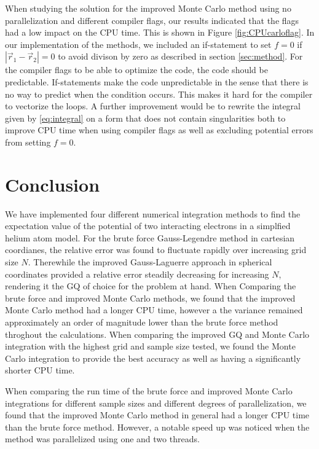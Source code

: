\documentclass[10pt, twocolumn]{aastex62}
\begin{document}
When studying the solution for the improved Monte Carlo method using no
parallelization and different compiler flags, our results indicated that the
flags had a low impact on the CPU time. This is shown in Figure
\ref{fig:CPUcarloflag}. In our implementation of the methods, we included an
if-statement to set $f=0$ if $|\vec{r}_1 - \vec{r}_2| = 0$ to avoid divison by
zero as described in section \ref{sec:method}. For the compiler flags to be able
to optimize the code, the code should be predictable. If-statements make the code
unpredictable in the sense that there is no way to predict when the condition
occurs. This makes it hard for the compiler to vectorize the loops. A further improvement would be to rewrite the integral given by
\ref{eq:integral} on a form that does not contain singularities both to improve
CPU time when using compiler flags as well as excluding potential errors from
setting $f=0$.



\section{Conclusion} \label{sec:conclusion}
We have implemented four different numerical integration methods to find the
expectation value of the potential of two interacting electrons in a simplfied
helium atom model. For the brute force Gauss-Legendre method in cartesian
coordianes, the relative error was found to fluctuate rapidly over increasing
grid size $N$. Therewhile the improved Gauss-Laguerre approach in spherical
coordinates provided a relative error steadily decreasing for increasing $N$,
rendering it the GQ of choice for the problem at hand. When Comparing the brute
force and improved Monte Carlo methods, we found that the improved Monte Carlo
method had a longer CPU time, however a the variance remained approximately an
order of magnitude lower than the brute force method throghout the calculations.
When comparing the improved GQ and Monte Carlo integration with the highest grid
and sample size tested, we found the Monte Carlo integration to provide the best
accuracy as well as having a significantly shorter CPU time.

When comparing the run time of the brute force and improved Monte Carlo
integrations for different sample sizes and different degrees of
parallelization, we found that the improved Monte Carlo method in general had a
longer CPU time than the brute force method. However, a notable speed up was
noticed when the method was parallelized using one and two threads.
\end{document}
